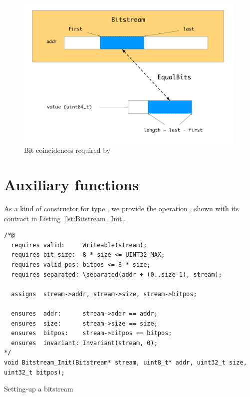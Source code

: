 \begin{figure}[hbt]
\begin{center}
\includegraphics[width=0.99\textwidth]{figures/equalbits.pdf}
\caption{\label{fig:EqualBits correspondance}
	Bit coincidences required by }
\end{center}
\end{figure}



\section{Auxiliary  functions}
\label{sec:bitstream-aux}


As a kind of constructor for type
, we provide the operation ,
shown with its contract in Listing~\ref{lst:Bitstream_Init}.




\begin{listing}[hbt]
\begin{minipage}{0.99\textwidth}
\begin{lstlisting}[style=acsl-block]
/*@
  requires valid:     Writeable(stream);
  requires bit_size:  8 * size <= UINT32_MAX;
  requires valid_pos: bitpos <= 8 * size;
  requires separated: \separated(addr + (0..size-1), stream);

  assigns  stream->addr, stream->size, stream->bitpos;

  ensures  addr:      stream->addr == addr;
  ensures  size:      stream->size == size;
  ensures  bitpos:    stream->bitpos == bitpos;
  ensures  invariant: Invariant(stream, 0);
*/
void Bitstream_Init(Bitstream* stream, uint8_t* addr, uint32_t size, uint32_t bitpos);
\end{lstlisting}
\end{minipage}
\caption{\label{lst:Bitstream_Init}Setting-up a bitstream}
\end{listing}


